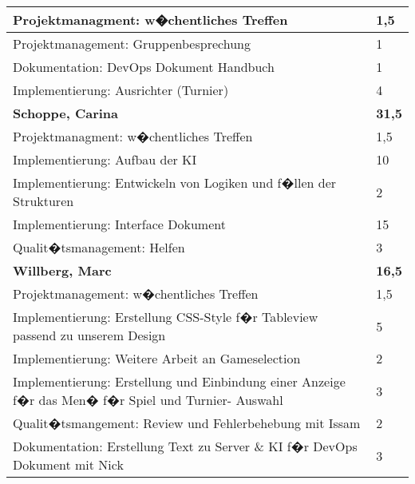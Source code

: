 \documentclass[a4paper,11pt]{scrartcl}
\begin{document}
\begin{longtable}{| p{13.8cm} | C{2.4cm} |}
  Projektmanagment: w�chentliches Treffen
	&
  1,5
	\\
	\hline

  Projektmanagement: Gruppenbesprechung
	&
  1
	\\
	\hline

  Dokumentation: DevOps Dokument Handbuch
	&
  1
	\\
	\hline

  Implementierung: Ausrichter (Turnier)
	&
  4
	\\
	\hline
	\hline


	\textbf{Schoppe, Carina} & \textbf{31,5}\\ %
	\hline

  Projektmanagment: w�chentliches Treffen
	&
  1,5
	\\
	\hline

  Implementierung: Aufbau der KI
	&
  10
	\\
	\hline

  Implementierung: Entwickeln von Logiken und f�llen der Strukturen
	&
  2
	\\
	\hline

  Implementierung: Interface Dokument
	&
  15
	\\
	\hline

  Qualit�tsmanagement: Helfen
	&
  3
	\\
	\hline
	\hline


	\textbf{Willberg, Marc} & \textbf{16,5}\\ %
	\hline

  Projektmanagement: w�chentliches Treffen
	&
  1,5
	\\
	\hline

  Implementierung: Erstellung CSS-Style f�r Tableview passend zu unserem Design
	&
  5
	\\
	\hline

  Implementierung: Weitere Arbeit an Gameselection
	&
  2
	\\
	\hline

  Implementierung: Erstellung und Einbindung einer Anzeige f�r das Men� f�r Spiel und Turnier- Auswahl
	&
  3
	\\
	\hline

  Qualit�tsmangement: Review und Fehlerbehebung mit Issam
	&
  2
	\\
	\hline

  Dokumentation: Erstellung Text zu Server \& KI f�r DevOps Dokument mit Nick
	&
  3
	\\
	\hline

\end{longtable}
\end{document}
